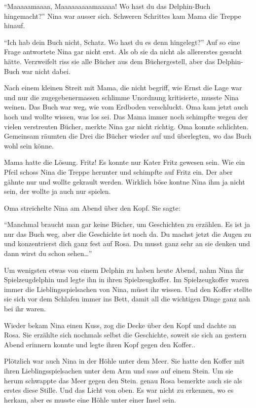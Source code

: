 \begin{mdframed}[style=mystyle]
\enquote{Maaaaamaaaa, Maaaaaaaaamaaaaa! Wo hast du das Delphin-Buch hingemacht?} Nina war ausser sich. Schweren Schrittes kam Mama die Treppe hinauf.

\enquote{Ich hab dein Buch nicht, Schatz. Wo hast du es denn hingelegt?} Auf so eine Frage antwortete Nina gar nicht erst. Als ob sie da nicht als allererstes gesucht hätte. Verzweifelt riss sie alle Bücher aus dem Büchergestell, aber das Delphin-Buch war nicht dabei.

Nach einem kleinen Streit mit Mama, die nicht begriff, wie Ernst die Lage war und nur die zugegebenermassen schlimme Unordnung kritisierte, musste Nina weinen. Das Buch war weg, wie vom Erdboden verschluckt. Oma kam jetzt auch hoch und wollte wissen, was los sei. Das Mama immer noch schimpfte wegen der vielen verstreuten Bücher, merkte Nina gar nicht richtig. Oma konnte schlichten. Gemeinsam räumten die Drei die Bücher wieder auf und überlegten, wo das Buch wohl sein könne.

Mama hatte die Lösung. Fritz! Es konnte nur Kater Fritz gewesen sein. Wie ein Pfeil schoss Nina die Treppe herunter und schimpfte auf Fritz ein. Der aber gähnte nur und wollte gekrault werden. Wirklich böse kontne Nina ihm ja nicht sein, der wollte ja auch nur spielen.

Oma streichelte Nina am Abend über den Kopf. Sie sagte:

\enquote{Manchmal braucht man gar keine Bücher, um Geschichten zu erzählen. Es ist ja nur das Buch weg, aber die Geschichte ist noch da. Du machst jetzt die Augen zu und konzentrierst dich ganz fest auf Rosa. Du musst ganz sehr an sie denken und dann wirst du schon sehen\dots}

Um wenigsten etwas von einem Delphin zu haben heute Abend, nahm Nina ihr Spielzeugdelphin und legte ihn in ihren Spielzeugkoffer. Im Spielzeugkoffer waren immer die Lieblingsspielsachen von Nina, müsst ihr wissen. Und den Koffer stellte sie sich vor dem Schlafen immer ins Bett, damit all die wichtigen Dinge ganz nah bei ihr waren.

Wieder bekam Nina einen Kuss, zog die Decke über den Kopf und dachte an Rosa. Sie erzählte sich nochmals selbst die Geschichte, soweit sie sich an gestern Abend erinnern konnte und legte ihren Kopf gegen den Koffer..
\end{mdframed}\medskip

Plötzlich war auch Nina in der Höhle unter dem Meer. Sie hatte den Koffer mit ihren Lieblingsspielsachen unter dem Arm und sass auf einem Stein. Um sie herum schwappte das Meer gegen den Stein. genau Rosa bemerkte auch sie als erstes diese Stille. Und das Licht von oben. Es war nicht zu erkennen, wo es herkam, aber es musste eine Höhle unter einer Insel sein.

